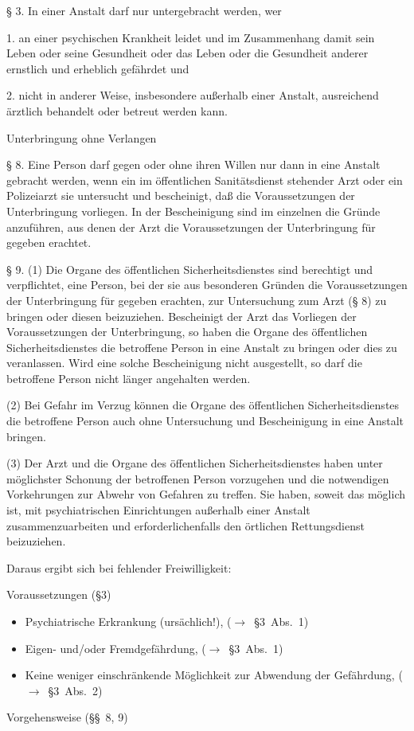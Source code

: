 \documentclass{article}
\begin{document}
{\S} 3. In einer Anstalt darf nur untergebracht werden, wer

1. an einer psychischen Krankheit leidet und im Zusammenhang damit sein
Leben oder seine Gesundheit oder das Leben oder die Gesundheit anderer
ernstlich und erheblich gef\"ahrdet und

2. nicht in anderer Weise, insbesondere au{\ss}erhalb einer Anstalt,
ausreichend \"arztlich behandelt oder betreut werden kann.

Unterbringung ohne Verlangen

{\S} 8. Eine Person darf gegen oder ohne ihren Willen nur dann in eine
Anstalt gebracht werden, wenn ein im \"offentlichen Sanit\"atsdienst
stehender Arzt oder ein Polizeiarzt sie untersucht und bescheinigt,
da{\ss} die Voraussetzungen der Unterbringung vorliegen. In der
Bescheinigung sind im einzelnen die Gr\"unde anzuf\"uhren, aus denen
der Arzt die Voraussetzungen der Unterbringung f\"ur gegeben erachtet.

{\S} 9. (1) Die Organe des \"offentlichen Sicherheitsdienstes sind
berechtigt und verpflichtet, eine Person, bei der sie aus besonderen
Gr\"unden die Voraussetzungen der Unterbringung f\"ur gegeben erachten,
zur Untersuchung zum Arzt ({\S} 8) zu bringen oder diesen beizuziehen.
Bescheinigt der Arzt das Vorliegen der Voraussetzungen der
Unterbringung, so haben die Organe des \"offentlichen
Sicherheitsdienstes die betroffene Person in eine Anstalt zu bringen
oder dies zu veranlassen. Wird eine solche Bescheinigung nicht
ausgestellt, so darf die betroffene Person nicht l\"anger angehalten
werden.

(2) Bei Gefahr im Verzug k\"onnen die Organe des \"offentlichen
Sicherheitsdienstes die betroffene Person auch ohne Untersuchung und
Bescheinigung in eine Anstalt bringen.

(3) Der Arzt und die Organe des \"offentlichen Sicherheitsdienstes haben
unter m\"oglichster Schonung der betroffenen Person vorzugehen und die
notwendigen Vorkehrungen zur Abwehr von Gefahren zu treffen. Sie haben,
soweit das m\"oglich ist, mit psychiatrischen Einrichtungen
au{\ss}erhalb einer Anstalt zusammenzuarbeiten und erforderlichenfalls
den \"ortlichen Rettungsdienst beizuziehen.

Daraus ergibt sich bei fehlender Freiwilligkeit:

Voraussetzungen ({\S}3)

\begin{itemize}
\item Psychiatrische Erkrankung (urs\"achlich!),
(${\rightarrow}$~{\S}3~Abs.~1)

\item Eigen-  und/oder Fremdgef\"ahrdung, (${\rightarrow}$~{\S}3~Abs.~1)

\item Keine weniger einschr\"ankende M\"oglichkeit zur Abwendung der
Gef\"ahrdung, (${\rightarrow}$~{\S}3~Abs.~2)

\end{itemize}
Vorgehensweise ({\S}{\S}~8, 9)
\end{document}
